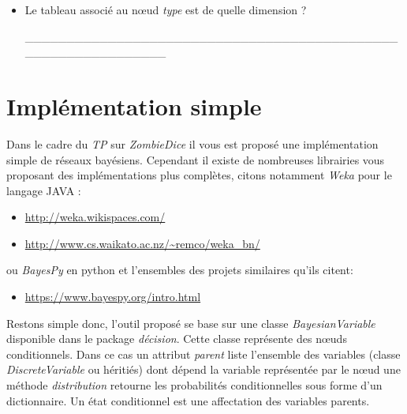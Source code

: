 \documentclass[a4paper, 10pt]{article}
\begin{document}
\begin{itemize}[$\bigcirc$]
\begin{lstlisting}[caption={Reseau bayésien mourir avec un dé}]
.
\end{lstlisting}

  \item Le tableau associé au n\oe{}ud \emph{type} est de quelle dimension ?

  \medskip

  \_\_\_\_\_\_\_\_\_\_\_\_\_\_\_\_\_\_\_\_\_\_\_\_\_\_\_\_\_\_\_\_\_\_\_\_\_\_\_\_\_\_\_\_\_\_\_\_\_\_\_\_\_\_\_\_\_\_\_\_\_\_


%

  \end{itemize}

  \section{Implémentation simple}

  Dans le cadre du \emph{TP} sur \emph{ZombieDice} il vous est proposé une implémentation simple de réseaux bayésiens.
  Cependant il existe de nombreuses librairies vous proposant des implémentations plus complètes, citons notamment \emph{Weka} pour le langage JAVA :
  \begin{itemize}
    \item \url{http://weka.wikispaces.com/}
    \item \url{http://www.cs.waikato.ac.nz/~remco/weka_bn/}
  \end{itemize}
  ou \emph{BayesPy} en python et l'ensembles des projets similaires qu'ils citent:
  \begin{itemize}
    \item \url{https://www.bayespy.org/intro.html}
  \end{itemize}

  Restons simple donc, l’outil proposé se base sur une classe \emph{BayesianVariable} disponible dans le package \emph{décision}.
  Cette classe représente des n\oe{}uds conditionnels.
  Dans ce cas un attribut \emph{parent} liste l'ensemble des variables (classe \emph{DiscreteVariable} ou héritiés) dont dépend la variable représentée par le n\oe{}ud
  une méthode \emph{distribution} retourne les probabilités conditionnelles sous forme d'un dictionnaire.
  Un état conditionnel est une affectation des variables parents.
\end{document}
